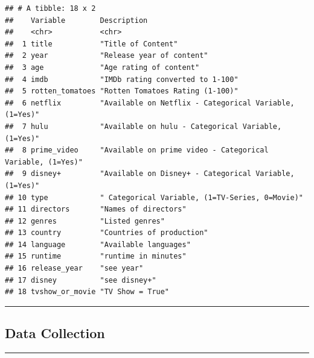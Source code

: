 \documentclass[
]{article}
\begin{document}
\begin{verbatim}
## # A tibble: 18 x 2
##    Variable        Description                                               
##    <chr>           <chr>                                                     
##  1 title           "Title of Content"                                        
##  2 year            "Release year of content"                                 
##  3 age             "Age rating of content"                                   
##  4 imdb            "IMDb rating converted to 1-100"                          
##  5 rotten_tomatoes "Rotten Tomatoes Rating (1-100)"                          
##  6 netflix         "Available on Netflix - Categorical Variable, (1=Yes)"    
##  7 hulu            "Available on hulu - Categorical Variable, (1=Yes)"       
##  8 prime_video     "Available on prime video - Categorical Variable, (1=Yes)"
##  9 disney+         "Available on Disney+ - Categorical Variable, (1=Yes)"    
## 10 type            " Categorical Variable, (1=TV-Series, 0=Movie)"           
## 11 directors       "Names of directors"                                      
## 12 genres          "Listed genres"                                           
## 13 country         "Countries of production"                                 
## 14 language        "Available languages"                                     
## 15 runtime         "runtime in minutes"                                      
## 16 release_year    "see year"                                                
## 17 disney          "see disney+"                                             
## 18 tvshow_or_movie "TV Show = True"
\end{verbatim}

\begin{center}\rule{0.5\linewidth}{0.5pt}\end{center}

\hypertarget{data-collection}{%
\subsection{Data Collection}\label{data-collection}}

\begin{center}\rule{0.5\linewidth}{0.5pt}\end{center}
\end{document}
